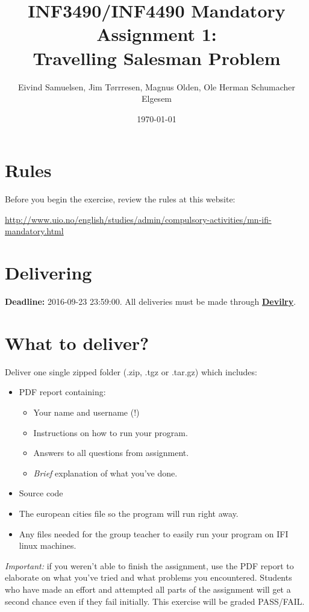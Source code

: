 \documentclass{article}           %
\title{\vspace{-2cm}INF3490/INF4490 Mandatory Assignment 1:\\
Travelling Salesman Problem}
\author{Eivind Samuelsen, Jim Tørrresen, Magnus Olden, Ole Herman Schumacher Elgesem}
\date{\today}
\newcommand\marginsymbol[1][0pt]{%
  \tabto*{0cm}\makebox[\dimexpr-1cm-#1\relax][r]{$\mathbb{P}$}\tabto*{\TabPrevPos}}
\begin{document}
    \renewcommand\marginsymbol[1][0pt]{%
  \tabto*{0cm}\makebox[-1cm][c]{$\mathbb{P}$}\tabto*{\TabPrevPos}}

\maketitle
\section*{Rules}
Before you begin the exercise, review the rules at this website:
\begin{center}
\url{http://www.uio.no/english/studies/admin/compulsory-activities/mn-ifi-mandatory.html}
\end{center}
\section*{Delivering}
\textbf{Deadline:} 2016-09-23 23:59:00. All deliveries must be made through
\href{https://devilry.ifi.uio.no}{\textbf{Devilry}}.
\section*{What to deliver?}
Deliver one single zipped folder (.zip, .tgz or .tar.gz) which includes:
\begin{itemize}
    \item PDF report containing:
    \begin{itemize}
        \item Your name and username (!)
        \item Instructions on how to run your program.
        \item Answers to all questions from assignment.
        \item \emph{Brief} explanation of what you've done.
    \end{itemize}
    \item Source code
    \item The european cities file so the program will run right away.
    \item Any files needed for the group teacher to easily run your program on
          IFI linux machines.
\end{itemize}
\emph{Important: } if you weren't able to finish the assignment, use the PDF
report to elaborate on what you've tried and what problems you encountered.
Students who have made an effort and attempted all parts of the assignment
will get a second chance even if they fail initially. This exercise will be
graded PASS/FAIL.
\end{document}

